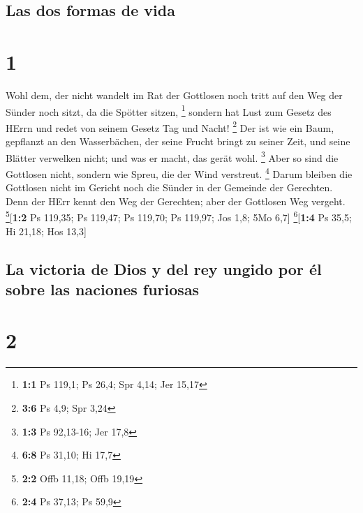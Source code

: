 \hypertarget{las-dos-formas-de-vida}{%
\subsection{Las dos formas de vida}\label{las-dos-formas-de-vida}}

\hypertarget{section}{%
\section{1}\label{section}}

 Wohl dem, der nicht wandelt im Rat der Gottlosen noch
tritt auf den Weg der Sünder noch sitzt, da die Spötter sitzen,
\footnote{\textbf{1:1} Ps 119,1; Ps 26,4; Spr 4,14; Jer 15,17}
 sondern hat Lust zum Gesetz des HErrn und redet von
seinem Gesetz Tag und Nacht! \footnote{\textbf{3:6} Ps 4,9; Spr 3,24}
 Der ist wie ein Baum, gepflanzt an den Wasserbächen, der
seine Frucht bringt zu seiner Zeit, und seine Blätter verwelken nicht;
und was er macht, das gerät wohl. \footnote{\textbf{1:3} Ps 92,13-16;
  Jer 17,8}  Aber so sind die Gottlosen nicht, sondern wie
Spreu, die der Wind verstreut. \footnote{\textbf{6:8} Ps 31,10; Hi 17,7}
 Darum bleiben die Gottlosen nicht im Gericht noch die
Sünder in der Gemeinde der Gerechten.  Denn der HErr kennt
den Weg der Gerechten; aber der Gottlosen Weg vergeht.
\footnote{\textbf{2:2} Offb 11,18; Offb 19,19}{[}\textbf{1:2} Ps 119,35;
Ps 119,47; Ps 119,70; Ps 119,97; Jos 1,8; 5Mo 6,7{]}
\footnote{\textbf{2:4} Ps 37,13; Ps 59,9}{[}\textbf{1:4} Ps 35,5; Hi
21,18; Hos 13,3{]}

\hypertarget{la-victoria-de-dios-y-del-rey-ungido-por-uxe9l-sobre-las-naciones-furiosas}{%
\subsection{La victoria de Dios y del rey ungido por él sobre las
naciones
furiosas}\label{la-victoria-de-dios-y-del-rey-ungido-por-uxe9l-sobre-las-naciones-furiosas}}

\hypertarget{section-1}{%
\section{2}\label{section-1}}

